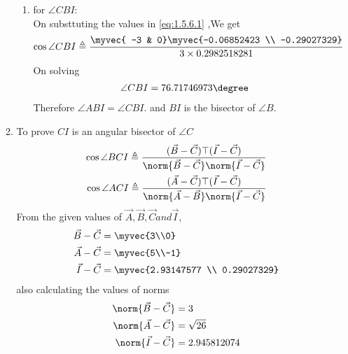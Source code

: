 \documentclass[11pt]{book}
\begin{document}
\begin{enumerate}[label=\thesection.\arabic*.,ref=\thesection.\theenumi]
\begin{enumerate}
\begin{enumerate}
       \item for $\angle CBI$: \\
    On substtuting the values in  \eqref{eq:1.5.6.1} ,We get 
    \begin{align}
        \cos{\angle CBI} \triangleq \frac{\myvec{ -3 & 0}\myvec{-0.06852423 \\ -0.29027329}}{ 3 \times 0.2982518281} \\
    \end{align}
    On solving 
    \begin{align}
        \angle CBI = 76.71746973\degree
    \end{align}
    Therefore $\angle ABI = \angle CBI.$ and $BI$ is the bisector of $\angle B$. 
\end{enumerate}

    \item To prove $CI$ is an angular bisector of $ \angle C$
\begin{align}
\label{eq:1.5.6.18}
\cos{\angle BCI} \triangleq \frac{(\vec{B}-\vec{C})\top(\vec{I}-\vec{C})}{\norm{\vec{B}-\vec{C}}\norm{\vec{I}-\vec{C}}} \\
\cos{\angle ACI} \triangleq \frac{(\vec{A}-\vec{C})\top(\vec{I}-\vec{C})}{\norm{\vec{A}-\vec{B}}\norm{\vec{I}-\vec{C}}} 
\end{align}
From the given values of $\vec{A},\vec{B},\vec{C} and \vec{I}$,\\
\begin{align}
	\vec{B}-\vec{C} &=\myvec{3\\0} \\
	\vec{A}-\vec{C}&= \myvec{5\\-1} \\
 \vec{I}-\vec{C}  &=\myvec{2.93147577 \\ 0.29027329}
\end{align}
also calculating the values of norms
\begin{align}
	\norm{\vec{B}-\vec{C}} &= 3 \\
	\norm{\vec{A}-\vec{C}} &= \sqrt{26} \\
 	\norm{\vec{I}-\vec{C}} &= 2.945812074 \\
\end{align}


\end{enumerate}
\end{enumerate}
\end{document}

